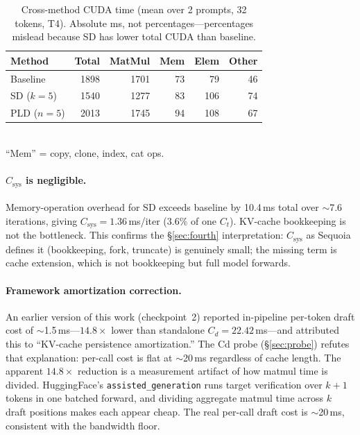 \documentclass[letterpaper,twocolumn,10pt]{article}
\begin{document}
\begin{table}[t]
\centering
\small
\caption{Cross-method CUDA time (mean over 2 prompts, 32 tokens, T4). Absolute ms, not percentages---percentages mislead because SD has lower total CUDA than baseline.}
\label{tab:profiler}
\smallskip
\begin{tabular}{@{}lrrrrr@{}}
\toprule
Method & Total & MatMul & Mem & Elem & Other \\
\midrule
Baseline     & 1898 & 1701 & 73 & 79 & 46 \\
SD ($k{=}5$) & 1540 & 1277 & 83 & 106 & 74 \\
PLD ($n{=}5$)& 2013 & 1745 & 94 & 108 & 67 \\
\bottomrule
\end{tabular}
\\[2pt]
{\scriptsize ``Mem'' = copy, clone, index, cat ops.}
\end{table}

\paragraph{$C_{\text{sys}}$ is negligible.}
Memory-operation overhead for SD exceeds baseline by 10.4\,ms total over $\sim$7.6 iterations, giving $C_{\text{sys}} = 1.36$\,ms/iter ($3.6\%$ of one $C_t$).
KV-cache bookkeeping is not the bottleneck.
This confirms the \S\ref{sec:fourth} interpretation: $C_{\text{sys}}$ as Sequoia defines it (bookkeeping, fork, truncate) is genuinely small; the missing term is cache extension, which is not bookkeeping but full model forwards.

\paragraph{Framework amortization correction.}
An earlier version of this work (checkpoint~2) reported in-pipeline per-token draft cost of $\sim$1.5\,ms---$14.8\times$ lower than standalone $C_d = 22.42$\,ms---and attributed this to ``KV-cache persistence amortization.''
The Cd probe (\S\ref{sec:probe}) refutes that explanation: per-call cost is flat at $\sim$20\,ms regardless of cache length.
The apparent $14.8\times$ reduction is a measurement artifact of how matmul time is divided.
HuggingFace's \texttt{assisted\_generation} runs target verification over $k{+}1$ tokens in one batched forward, and dividing aggregate matmul time across $k$ draft positions makes each appear cheap.
The real per-call draft cost is $\sim$20\,ms, consistent with the bandwidth floor.
\end{document}

